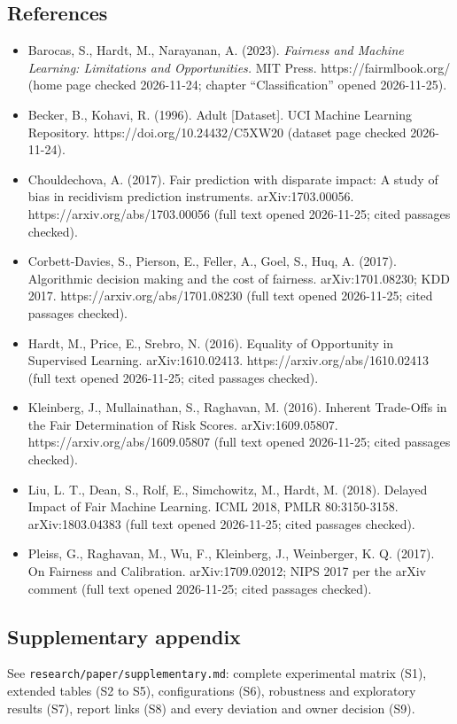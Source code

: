 \documentclass[
]{article}
\providecommand{\tightlist}{%
  \setlength{\itemsep}{0pt}\setlength{\parskip}{0pt}}
\begin{document}
\subsection{References}\label{references}

\begin{itemize}
\tightlist
\item
  Barocas, S., Hardt, M., Narayanan, A. (2023). \emph{Fairness and
  Machine Learning: Limitations and Opportunities.} MIT Press.
  https://fairmlbook.org/ (home page checked 2026-11-24; chapter
  ``Classification'' opened 2026-11-25).
\item
  Becker, B., Kohavi, R. (1996). Adult {[}Dataset{]}. UCI Machine
  Learning Repository. https://doi.org/10.24432/C5XW20 (dataset page
  checked 2026-11-24).
\item
  Chouldechova, A. (2017). Fair prediction with disparate impact: A
  study of bias in recidivism prediction instruments. arXiv:1703.00056.
  https://arxiv.org/abs/1703.00056 (full text opened 2026-11-25; cited
  passages checked).
\item
  Corbett-Davies, S., Pierson, E., Feller, A., Goel, S., Huq, A. (2017).
  Algorithmic decision making and the cost of fairness.
  arXiv:1701.08230; KDD 2017. https://arxiv.org/abs/1701.08230 (full
  text opened 2026-11-25; cited passages checked).
\item
  Hardt, M., Price, E., Srebro, N. (2016). Equality of Opportunity in
  Supervised Learning. arXiv:1610.02413.
  https://arxiv.org/abs/1610.02413 (full text opened 2026-11-25; cited
  passages checked).
\item
  Kleinberg, J., Mullainathan, S., Raghavan, M. (2016). Inherent
  Trade-Offs in the Fair Determination of Risk Scores. arXiv:1609.05807.
  https://arxiv.org/abs/1609.05807 (full text opened 2026-11-25; cited
  passages checked).
\item
  Liu, L. T., Dean, S., Rolf, E., Simchowitz, M., Hardt, M. (2018).
  Delayed Impact of Fair Machine Learning. ICML 2018, PMLR 80:3150-3158.
  arXiv:1803.04383 (full text opened 2026-11-25; cited passages
  checked).
\item
  Pleiss, G., Raghavan, M., Wu, F., Kleinberg, J., Weinberger, K. Q.
  (2017). On Fairness and Calibration. arXiv:1709.02012; NIPS 2017 per
  the arXiv comment (full text opened 2026-11-25; cited passages
  checked).
\end{itemize}

\subsection{Supplementary appendix}\label{supplementary-appendix}

See \texttt{research/paper/supplementary.md}: complete experimental
matrix (S1), extended tables (S2 to S5), configurations (S6), robustness
and exploratory results (S7), report links (S8) and every deviation and
owner decision (S9).
\end{document}
